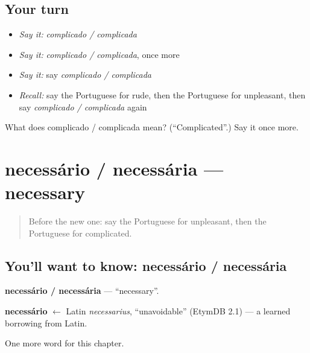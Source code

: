 \subsection*{Your turn}
\begin{itemize}
\raggedright
  \item \emph{Say it:} \emph{complicado / complicada}
  \item \emph{Say it:} \emph{complicado / complicada}, once more
  \item \emph{Say it:} say \emph{complicado / complicada}
  \item \emph{Recall:} say the Portuguese for rude, then the Portuguese for unpleasant, then say \emph{complicado / complicada} again
\end{itemize}

\begin{tcolorbox}[breakable,colback=teal!4,colframe=teal!35!black,title={Before you move on}]
What does complicado / complicada mean? (\textquotedblleft{}Complicated\textquotedblright{}.) Say it once more.
\end{tcolorbox}
\section[necessário / necessária]{necessário / necessária — necessary}

\label{lesson:PT-C154-necessario-necessaria}



\begin{quote}
Before the new one: say the Portuguese for unpleasant, then the Portuguese for complicated.
\end{quote}

\subsection*{You'll want to know: necessário / necessária}
\textbf{necessário / necessária} — \textquotedblleft{}necessary\textquotedblright{}.

\begin{cousinweb}
\textbf{necessário} $\leftarrow$ Latin \emph{necessarius}, \textquotedblleft{}unavoidable\textquotedblright{} (EtymDB 2.1) — a learned borrowing from Latin.
\end{cousinweb}

\begin{grammarlens}[title={What you've built}]
One more word for this chapter.
\end{grammarlens}

